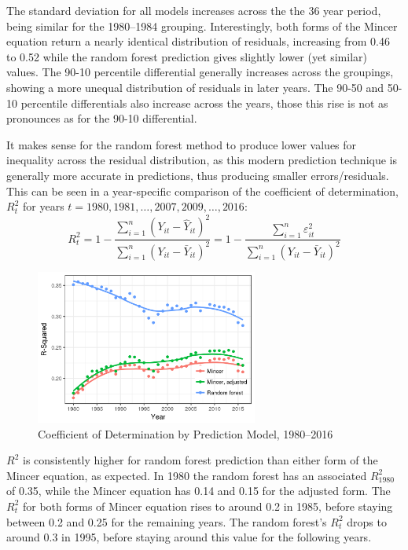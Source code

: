 \documentclass[notitlepage,12pt]{article}
\newcommand{\1}[1]{\ensuremath{\mathbb{1}\left( #1 \right)}}               %
\begin{document}
The standard deviation for all models increases across the the 36 year period, being similar for the 1980--1984 grouping.  Interestingly, both forms of the Mincer equation return a nearly identical distribution of residuals, increasing from 0.46 to 0.52 while the random forest prediction gives slightly lower (yet similar) values.  The 90-10 percentile differential generally increases across the groupings, showing a more unequal distribution  of residuals in later years.  The 90-50 and 50-10 percentile differentials also increase across the years, those this rise is not as pronounces as for the 90-10 differential.  

It makes sense for the random forest method to produce lower values for inequality across the residual distribution, as this modern prediction technique is generally more accurate in predictions, thus producing smaller errors/residuals.  This can be seen in a year-specific comparison of the coefficient of determination, $R_t^2$ for years $t=1980, 1981, \dots , 2007, 2009, \dots , 2016$:
\begin{equation}
R^2_t = 1 - \frac{\sum_{i=1}^n(Y_{it} -  \hat{Y}_{it})^2}{\sum_{i=1}^n (Y_{it} - \bar{Y}_{it})^2} = 1 - \frac{\sum_{i=1}^n\varepsilon_{it}^2}{\sum_{i=1}^n (Y_{it} - \bar{Y}_{it})^2}
\end{equation}

\begin{figure}[h]
  \caption{Coefficient of Determination by Prediction Model, 1980--2016}
  \centering
  \includegraphics[width=0.65\textwidth]{figures/rsquared.png}
\end{figure}
\noindent
$R^2$ is consistently higher for random forest prediction than either form of the Mincer equation, as expected.  In 1980 the random forest has an associated $R_{1980}^2$ of 0.35, while the Mincer equation has 0.14 and 0.15 for the adjusted form.  The $R_t^2$ for both forms of Mincer equation rises to around 0.2 in 1985, before staying between 0.2 and 0.25 for the remaining years.  The random forest's $R^2_t$ drops to around 0.3 in 1995, before staying around this value for the following years.
\end{document}
